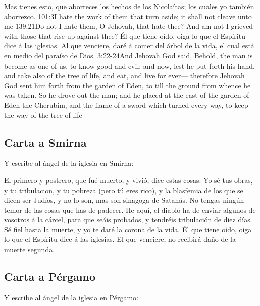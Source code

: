 Mas tienes esto, que aborreces los hechos de los Nicolaítas; los cuales yo también aborrezco.%
			{101:3}{I hate the work of them that turn aside; it shall not cleave unto me}%
			{139:21}{Do not I hate them, O Jehovah, that hate thee? And am not I grieved with those that rise up against thee?} %
Él que tiene oído, oiga lo que el Espíritu dice á las iglesias. Al que venciere, daré á comer del árbol de la vida, el cual está en medio del paraíso de Dios.%
				{3:22-24}{And Jehovah God said, Behold, the man is become as one of us, to know good and evil; and now, lest he put forth his hand, and take also of the tree of life, and eat, and live for ever— therefore Jehovah God sent him forth from the garden of Eden, to till the ground from whence he was taken. So he drove out the man; and he placed at the east of the garden of Eden the Cherubim, and the flame of a sword which turned every way, to keep the way of the tree of life}
\subsection*{Carta a Smirna}
Y escribe al ángel de la iglesia en Smirna:

El primero y postrero, que fué muerto, y vivió, dice estas cosas: %
Yo sé tus obras, y tu tribulacion, y tu pobreza (pero tú eres rico), y la blasfemia de los que se dicen ser Judíos, y no lo son, mas son sinagoga de Satanás. %
No tengas ningún temor de las cosas que has de padecer. He aquí, el diablo ha de enviar algunos de vosotros á la cárcel, para que seáis probados, y tendréis tribulación de diez días.%
 Sé fiel hasta la muerte, y yo te daré la corona de la vida. %
Él que tiene oído, oiga lo que el Espíritu dice á las iglesias. El que venciere, no recibirá daño de la muerte segunda.
\subsection*{Carta a Pérgamo}
Y escribe al ángel de la iglesia en Pérgamo:

